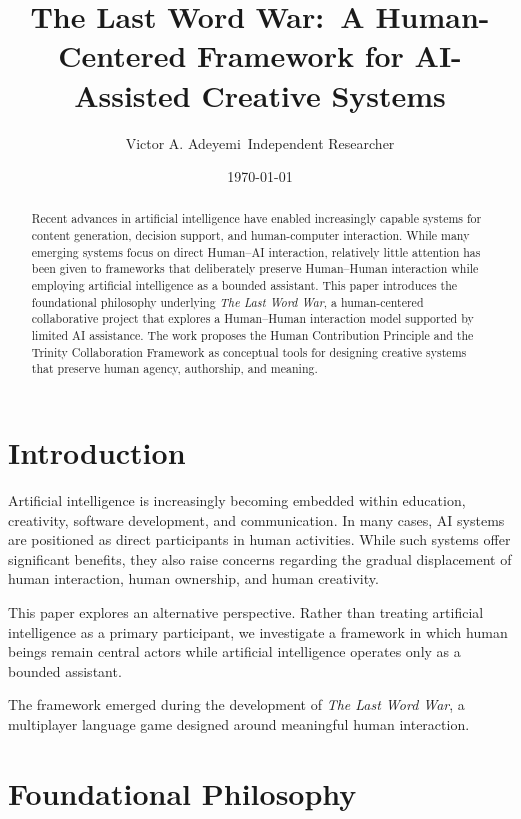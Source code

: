 \documentclass[11pt]{article}
\title{
The Last Word War:\
A Human-Centered Framework for AI-Assisted Creative Systems
}
\author{
Victor A. Adeyemi\
Independent Researcher
}
\date{\today}
\begin{document}
\maketitle

\begin{abstract}

Recent advances in artificial intelligence have enabled increasingly capable systems for content generation, decision support, and human-computer interaction. While many emerging systems focus on direct Human--AI interaction, relatively little attention has been given to frameworks that deliberately preserve Human--Human interaction while employing artificial intelligence as a bounded assistant. This paper introduces the foundational philosophy underlying \emph{The Last Word War}, a human-centered collaborative project that explores a Human--Human interaction model supported by limited AI assistance. The work proposes the Human Contribution Principle and the Trinity Collaboration Framework as conceptual tools for designing creative systems that preserve human agency, authorship, and meaning.

\end{abstract}

\section{Introduction}

Artificial intelligence is increasingly becoming embedded within education, creativity, software development, and communication. In many cases, AI systems are positioned as direct participants in human activities. While such systems offer significant benefits, they also raise concerns regarding the gradual displacement of human interaction, human ownership, and human creativity.

This paper explores an alternative perspective. Rather than treating artificial intelligence as a primary participant, we investigate a framework in which human beings remain central actors while artificial intelligence operates only as a bounded assistant.

The framework emerged during the development of \emph{The Last Word War}, a multiplayer language game designed around meaningful human interaction.

\section{Foundational Philosophy}
\end{document}
